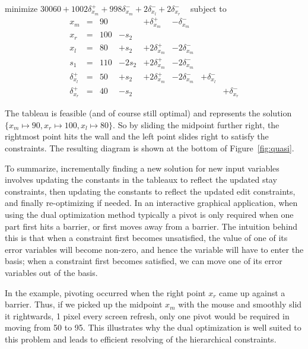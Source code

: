 \documentclass{article}
\begin{document}
\begin{trivlist}\item
minimize $30060 + 1002 \delta_{x_m}^+ + 998 \delta_{x_m}^-  + 2
\delta_{x_l}^- + 2\delta_{x_r}^- $ 
~ subject to 
$$
\begin{array}{rlrrrrrr} 
x_m & = &90 & & + \delta_{x_m}^+ & - \delta_{x_m}^- \\
x_r & = &100 & - s_2 \\ \hline
x_l & = & 80 & + s_2 & + 2 \delta_{x_m}^+ & - 2 \delta_{x_m}^- \\
s_1 & = &110 & - 2 s_2 & + 2 \delta_{x_m}^+ & - 2\delta_{x_m}^- \\
\delta_{x_l}^+ & = & 50 & + s_2 & + 2 \delta_{x_m}^+ & - 2\delta_{x_m}^- &
                + \delta_{x_l}^- \\
\delta_{x_r}^+ & = & 40 & - s_2 &&&&  +\delta_{x_r}^-
\end{array}
$$
\end{trivlist}
The tableau is feasible (and of course still
optimal) and represents the solution
$\{x_m \mapsto 90, x_r \mapsto 100, x_l \mapsto 80\}$.
So by sliding the midpoint further right, the rightmost point hits the wall
and the left point slides right to satisfy the constraints.
The resulting diagram is shown at the bottom of Figure~\ref{fig:quasi}.

To summarize, incrementally finding a new solution for new input variables
involves updating the constants in the tableaux to reflect the updated stay
constraints, then updating the constants to reflect the updated edit
constraints, and finally re-optimizing if needed.  In an interactive
graphical application, when using the dual optimization method typically a
pivot is only required when one part first hits a barrier, or first moves
away from a barrier.  The intuition behind this is that
when a constraint
first becomes unsatisfied, the value of one of its error variables will
become non-zero, and hence the variable will have to enter the basis;
when a constraint first becomes satisfied,
we can move one of its error variables out of the basis.

In the example, pivoting occurred when the right point $x_r$ came up against a
barrier.  Thus, if we picked up the midpoint $x_m$ with the mouse and
smoothly slid it rightwards, 1 pixel every screen refresh, only one pivot
would be required in moving from 50 to 95.  This illustrates why the dual
optimization is well suited to this problem and leads to efficient
resolving of the hierarchical constraints.
\end{document}
